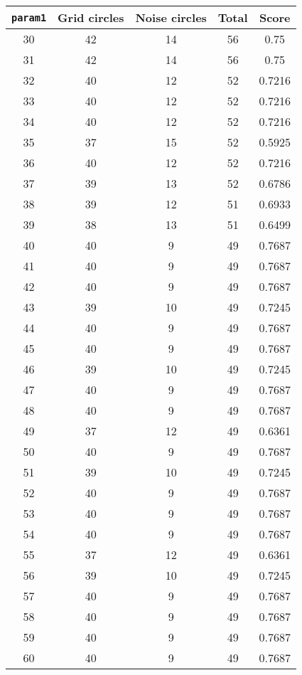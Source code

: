 \documentclass[letterpaper, 12pt]{article}
\begin{document}
\begin{longtable}{|c|c|c|c|c|}
\hline
\textbf{\texttt{param1}} & \textbf{Grid circles} & \textbf{Noise circles} & \textbf{Total} & \textbf{Score} \\
\hline
30 & 42 & 14 & 56 & 0.75 \\
\hline
31 & 42 & 14 & 56 & 0.75 \\
\hline
32 & 40 & 12 & 52 & 0.7216 \\
\hline
33 & 40 & 12 & 52 & 0.7216 \\
\hline
34 & 40 & 12 & 52 & 0.7216 \\
\hline
35 & 37 & 15 & 52 & 0.5925 \\
\hline
36 & 40 & 12 & 52 & 0.7216 \\
\hline
37 & 39 & 13 & 52 & 0.6786 \\
\hline
38 & 39 & 12 & 51 & 0.6933 \\
\hline
39 & 38 & 13 & 51 & 0.6499 \\
\hline
40 & 40 & 9 & 49 & 0.7687 \\
\hline
41 & 40 & 9 & 49 & 0.7687 \\
\hline
42 & 40 & 9 & 49 & 0.7687 \\
\hline
43 & 39 & 10 & 49 & 0.7245 \\
\hline
44 & 40 & 9 & 49 & 0.7687 \\
\hline
45 & 40 & 9 & 49 & 0.7687 \\
\hline
46 & 39 & 10 & 49 & 0.7245 \\
\hline
47 & 40 & 9 & 49 & 0.7687 \\
\hline
48 & 40 & 9 & 49 & 0.7687 \\
\hline
49 & 37 & 12 & 49 & 0.6361 \\
\hline
50 & 40 & 9 & 49 & 0.7687 \\
\hline
51 & 39 & 10 & 49 & 0.7245 \\
\hline
52 & 40 & 9 & 49 & 0.7687 \\
\hline
53 & 40 & 9 & 49 & 0.7687 \\
\hline
54 & 40 & 9 & 49 & 0.7687 \\
\hline
55 & 37 & 12 & 49 & 0.6361 \\
\hline
56 & 39 & 10 & 49 & 0.7245 \\
\hline
57 & 40 & 9 & 49 & 0.7687 \\
\hline
58 & 40 & 9 & 49 & 0.7687 \\
\hline
59 & 40 & 9 & 49 & 0.7687 \\
\hline
60 & 40 & 9 & 49 & 0.7687 \\
\hline

\end{longtable}
\end{document}
